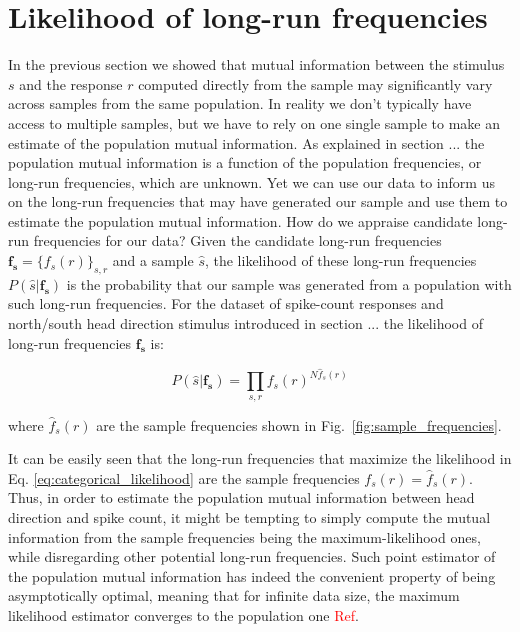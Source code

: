 \section{Likelihood of long-run frequencies}\label{sec:likelihood} 


In the previous section we showed that mutual information between the stimulus $s$ and the response $r$ computed directly from the sample may significantly vary across samples from the same population. In reality we don't typically have access to multiple samples, but we have to rely on one single sample to make an estimate of the population mutual information. As explained in section ... the population mutual information is a function of the population frequencies, or long-run frequencies, which are unknown. Yet we can use our data to inform us on the long-run frequencies that may have generated our sample and use them to estimate the population mutual information. How do we appraise candidate long-run frequencies for our data? Given the candidate long-run frequencies $\mathbf{f_s}=\{f_s(r)\}_{s,r}$ and a sample $\hat{s}$, the likelihood of these long-run frequencies $P(\hat{s}\vert \mathbf{f_s})$ is the probability that our sample was generated from a population with such long-run frequencies. For the dataset of spike-count responses and north/south head direction stimulus introduced in section ... the likelihood of long-run frequencies $\mathbf{f_s}$ is: 


\begin{equation}
P(\hat{s}\vert \mathbf{f_s})=\prod_{s,r} f_s(r)^{N\hat{f}_s(r)}
\label{eq:categorical_likelihood}
\end{equation}

where $\hat{f}_s(r)$ are the sample frequencies shown in Fig.~\ref{fig:sample_frequencies}. 

It can be easily seen that the long-run frequencies that maximize the likelihood in Eq. \ref{eq:categorical_likelihood} are the sample frequencies $f_s(r)=\hat{f}_s(r)$. Thus, in order to estimate the population mutual information between head direction and spike count, it might be tempting to simply compute the mutual information from the sample frequencies being the maximum-likelihood ones, while disregarding other potential long-run frequencies. Such point estimator of the population mutual information has indeed the convenient property of being asymptotically optimal, meaning that for infinite data size, the maximum likelihood estimator converges to the population one \textcolor{red}{Ref}. 


